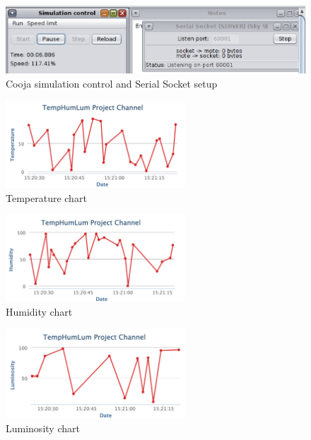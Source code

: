 \documentclass[11pt]{article}
\begin{document}
\begin{figure}[h]
  \includegraphics[width=1\textwidth]{images/serial_server_socket.png}
  \caption{Cooja simulation control and Serial Socket setup}
\end{figure}

\begin{figure}[h]
  \centering
  \includegraphics[width=0.6\textwidth]{images/temperature.png}
  \caption{Temperature chart}
\end{figure}
\begin{figure}[h]
  \centering
  \includegraphics[width=0.6\textwidth]{images/humidity.png}
  \caption{Humidity chart}
\end{figure}
\begin{figure}[h]
  \centering
  \includegraphics[width=0.6\textwidth]{images/luminosity.png}
  \caption{Luminosity chart}
\end{figure}
\end{document}
